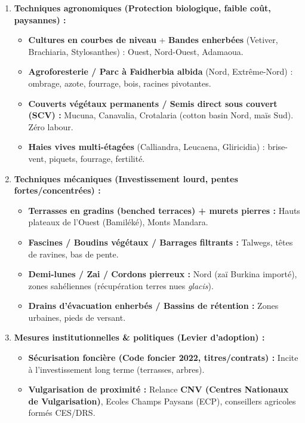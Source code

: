 \documentclass[11pt]{article}
\begin{document}
\begin{corrige}
\begin{methode}
\begin{enumerate}
    \item \textbf{Techniques agronomiques (Protection biologique, faible coût, paysannes) :}
    \begin{itemize}
        \item \textbf{Cultures en courbes de niveau} + \textbf{Bandes enherbées} (Vetiver, Brachiaria, Stylosanthes) : Ouest, Nord-Ouest, Adamaoua.
        \item \textbf{Agroforesterie / Parc à Faidherbia albida} (Nord, Extrême-Nord) : ombrage, azote, fourrage, bois, racines pivotantes.
        \item \textbf{Couverts végétaux permanents / Semis direct sous couvert (SCV) :} Mucuna, Canavalia, Crotalaria (cotton basin Nord, maïs Sud). Zéro labour.
        \item \textbf{Haies vives multi-étagées} (Calliandra, Leucaena, Gliricidia) : brise-vent, piquets, fourrage, fertilité.
    \end{itemize}
    \item \textbf{Techniques mécaniques (Investissement lourd, pentes fortes/concentrées) :}
    \begin{itemize}
        \item \textbf{Terrasses en gradins (benched terraces) + murets pierres :} Hauts plateaux de l'Ouest (Bamiléké), Monts Mandara.
        \item \textbf{Fascines / Boudins végétaux / Barrages filtrants :} Talwegs, têtes de ravines, bas de pente.
        \item \textbf{Demi-lunes / Zai / Cordons pierreux :} Nord (zaï Burkina importé), zones sahéliennes (récupération terres nues \emph{glacis}).
        \item \textbf{Drains d'évacuation enherbés / Bassins de rétention :} Zones urbaines, pieds de versant.
    \end{itemize}
    \item \textbf{Mesures institutionnelles \& politiques (Levier d'adoption) :}
    \begin{itemize}
        \item \textbf{Sécurisation foncière (Code foncier 2022, titres/contrats) :} Incite à l'investissement long terme (terrasses, arbres).
        \item \textbf{Vulgarisation de proximité :} Relance \textbf{CNV (Centres Nationaux de Vulgarisation)}, Ecoles Champs Paysans (ECP), conseillers agricoles formés CES/DRS.

\end{itemize}
\end{enumerate}
\end{methode}
\end{corrige}
\end{document}
